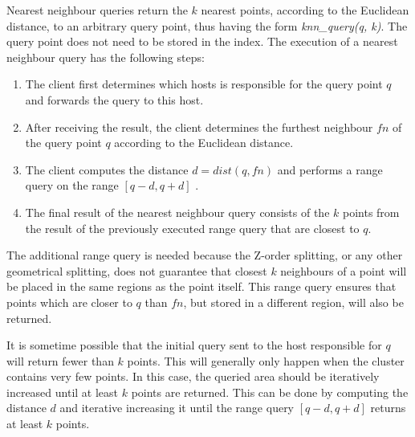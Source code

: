 \documentclass[11pt,a4paper]{globis-book}
\begin{document}
Nearest neighbour queries return the $k$ nearest points, according to the Euclidean distance, to an arbitrary query point, thus having the form \textit{knn\_query(q, k)}. The query point does not need to be stored in the index. The execution of a nearest neighbour query has the following steps:
\begin{enumerate}
    \item The client first determines which hosts is responsible for the query point $q$ and forwards the query to this host.
    \item After receiving the result, the client determines the furthest neighbour $fn$ of the query point $q$ according to the Euclidean distance. 
    \item The client computes the distance $d = dist(q, fn)$ and performs a range query on the range $[q - d, q + d]$ .
    \item The final result of the nearest neighbour query consists of the $k$ points from the result of the previously executed range query that are closest to $q$.  
\end{enumerate}

The additional range query is needed because the Z-order splitting, or any other geometrical splitting, does not guarantee that closest $k$ neighbours of a point will be placed in the same regions as the point itself. This range query ensures that points which are closer to $q$ than $fn$, but stored in a different region, will also be returned. 

It is sometime possible that the initial query sent to the host responsible for $q$ will return fewer than $k$ points. This will generally only happen when the cluster contains very few points. In this case, the queried area should be iteratively increased until at least $k$ points are returned. This can be done by computing the distance $d$ and iterative increasing it until the range query $[q - d, q + d]$ returns at least $k$ points.
\end{document}
